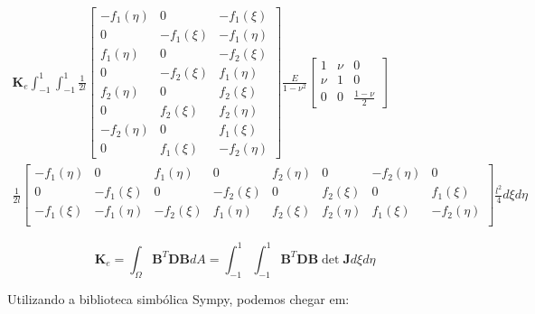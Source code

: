     \begin{multline}
        \mathbf{K}_e \int_{-1}^{1} \int_{-1}^{1}  
         \frac{1}{2l}\begin{bmatrix}
            -f_1(\eta) & 0 & -f_1(\xi)\\
            0          & -f_1(\xi) & -f_1(\eta)\\
            f_1(\eta) & 0 & -f_2(\xi)\\
            0          & -f_2(\xi) & f_1(\eta)\\
            f_2(\eta) & 0 & f_2(\xi)\\
            0          & f_2(\xi) & f_2(\eta)\\
            -f_2(\eta) & 0 & f_1(\xi)\\
            0          & f_1(\xi) & -f_2(\eta)
        \end{bmatrix} 
        \frac{E}{1-\nu^2}
        \begin{bmatrix}
            1 & \nu & 0\\
            \nu & 1 & 0\\
            0 & 0 & \frac{1-\nu}{2}
        \end{bmatrix}\\
        \frac{1}{2l}\begin{bmatrix}
            -f_1(\eta) & 0 & f_1(\eta) & 0 & f_2(\eta) & 0 & -f_2(\eta) & 0 \\
            0 & -f_1(\xi) & 0 & -f_2(\xi) & 0 & f_2(\xi) & 0 & f_1(\xi)\\
            -f_1(\xi) & -f_1(\eta) & -f_2(\xi) & f_1(\eta) & f_2(\xi) & f_2(\eta) & f_1(\xi) & -f_2(\eta)\\
        \end{bmatrix} 
        \frac{l^2}{4} d\xi d\eta
    \end{multline}

    \begin{equation}
        \mathbf{K}_e = \int_\Omega  \mathbf{B}^T \mathbf{D} \mathbf{B} dA = \int_{-1}^{1} \int_{-1}^{1}  \mathbf{B}^T \mathbf{D} \mathbf{B} \det \mathbf{J} d\xi d\eta
    \end{equation}

    Utilizando a biblioteca simbólica Sympy, podemos chegar em:

